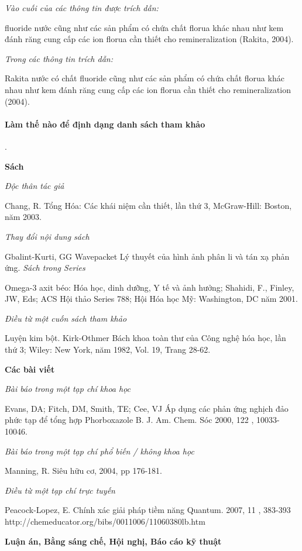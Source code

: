 \documentclass{hcmutarticle}
\begin{document}
{\em Vào cuối của các thông tin được trích dẫn:}

fluoride nước cũng như các sản phẩm có chứa chất florua khác nhau như kem đánh răng cung cấp các ion florua cần thiết cho remineralization (Rakita, 2004).

{\em Trong các thông tin trích dẫn:}

Rakita nước có chất fluoride cũng như các sản phẩm có chứa chất florua khác nhau như kem đánh răng cung cấp các ion florua cần thiết cho remineralization (2004).

\paragraph{Làm thế nào để định dạng danh sách tham khảo}.

{\bfseries Sách}

{\em Độc thân tác giả}

Chang, R. Tổng Hóa: Các khái niệm cần thiết, lần thứ 3, McGraw-Hill: Boston, năm 2003.

{\em Thay đổi nội dung sách}

Gbalint-Kurti, GG Wavepacket Lý thuyết của hình ảnh phân li và tán xạ phản ứng. 
{\em Sách trong Series}

Omega-3 axit béo: Hóa học, dinh dưỡng, Y tế và ảnh hưởng; Shahidi, F., Finley, JW, Eds; ACS Hội thảo Series 788; Hội Hóa học Mỹ: Washington, DC năm 2001.

{\em Điều từ một cuốn sách tham khảo}

Luyện kim bột. Kirk-Othmer Bách khoa toàn thư của Công nghệ hóa học, lần thứ 3; Wiley: New York, năm 1982, Vol. 19, Trang 28-62.

{\bfseries Các bài viết}

{\em Bài báo trong một tạp chí khoa học}

Evans, DA; Fitch, DM, Smith, TE; Cee, VJ Áp dụng các phản ứng nghịch đảo phức tạp để tổng hợp Phorboxazole B. J. Am. Chem. Sóc 2000, 122 , 10033-10046.

{\em Bài báo trong một tạp chí phổ biến / không khoa học}

Manning, R. Siêu hữu cơ, 2004, pp 176-181.

{\em Điều từ một tạp chí trực tuyến}

Peacock-Lopez, E. Chính xác giải pháp tiềm năng Quantum. 2007, 11 , 383-393 http://chemeducator.org/bibs/0011006/11060380lb.htm 

{\bfseries Luận án, Bằng sáng chế, Hội nghị, Báo cáo kỹ thuật}
\end{document}
